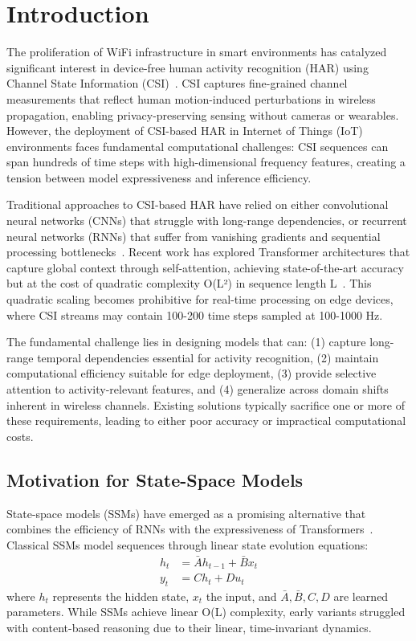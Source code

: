 \documentclass[journal]{IEEEtran}
\begin{document}
\section{Introduction}

The proliferation of WiFi infrastructure in smart environments has catalyzed significant interest in device-free human activity recognition (HAR) using Channel State Information (CSI)~\cite{liu2024wifi,yang2023sensefi}. CSI captures fine-grained channel measurements that reflect human motion-induced perturbations in wireless propagation, enabling privacy-preserving sensing without cameras or wearables. However, the deployment of CSI-based HAR in Internet of Things (IoT) environments faces fundamental computational challenges: CSI sequences can span hundreds of time steps with high-dimensional frequency features, creating a tension between model expressiveness and inference efficiency.

Traditional approaches to CSI-based HAR have relied on either convolutional neural networks (CNNs) that struggle with long-range dependencies, or recurrent neural networks (RNNs) that suffer from vanishing gradients and sequential processing bottlenecks~\cite{zhang2023attention}. Recent work has explored Transformer architectures that capture global context through self-attention, achieving state-of-the-art accuracy but at the cost of quadratic complexity O(L²) in sequence length L~\cite{vaswani2017attention}. This quadratic scaling becomes prohibitive for real-time processing on edge devices, where CSI streams may contain 100-200 time steps sampled at 100-1000 Hz.

The fundamental challenge lies in designing models that can: (1) capture long-range temporal dependencies essential for activity recognition, (2) maintain computational efficiency suitable for edge deployment, (3) provide selective attention to activity-relevant features, and (4) generalize across domain shifts inherent in wireless channels. Existing solutions typically sacrifice one or more of these requirements, leading to either poor accuracy or impractical computational costs.

\subsection{Motivation for State-Space Models}

State-space models (SSMs) have emerged as a promising alternative that combines the efficiency of RNNs with the expressiveness of Transformers~\cite{gu2021efficiently}. Classical SSMs model sequences through linear state evolution equations:
\begin{align}
h_t &= \bar{A}h_{t-1} + \bar{B}x_t \\
y_t &= Ch_t + Du_t
\end{align}
where $h_t$ represents the hidden state, $x_t$ the input, and $\bar{A}, \bar{B}, C, D$ are learned parameters. While SSMs achieve linear O(L) complexity, early variants struggled with content-based reasoning due to their linear, time-invariant dynamics.
\end{document}
